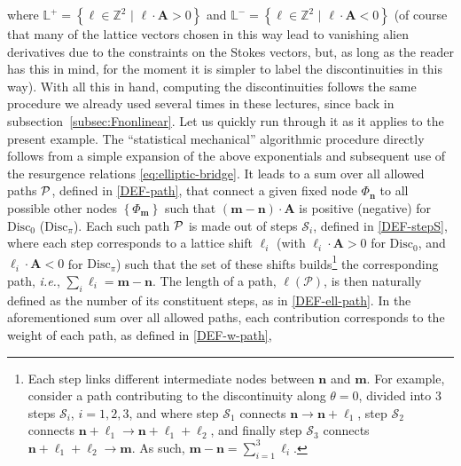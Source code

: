 \documentclass[11pt,a4paper]{article}
\newcommand{\CP}{{\cal P}}
\def\BL{{\mathbb L}}
\def\disc{{\mathrm{Disc}}}
\begin{document}
where $\BL^+ = \left\{ \boldsymbol{\ell} \in \mathbb{Z}^2 \,\,|\,\, \boldsymbol{\ell} \cdot \boldsymbol{A} >0 \right\}$ and $\BL^- = \left\{ \boldsymbol{\ell} \in \mathbb{Z}^2 \,\,|\,\, \boldsymbol{\ell} \cdot \boldsymbol{A} < 0 \right\}$ (of course that many of the lattice vectors chosen in this way lead to vanishing alien derivatives due to the constraints on the Stokes vectors, but, as long as the reader has this in mind, for the moment it is simpler to label the discontinuities in this way). With all this in hand, computing the discontinuities follows the same procedure we already used several times in these lectures, since back in subsection~\ref{subsec:Fnonlinear}. Let us quickly run through it as it applies to the present example. The ``statistical mechanical'' algorithmic procedure directly follows from a simple expansion of the above exponentials and subsequent use of the resurgence relations \eqref{eq:elliptic-bridge}. It leads to a sum over all allowed paths $\CP$, defined in \eqref{DEF-path}, that connect a given fixed node $\Phi_{\boldsymbol{n}}$ to all possible other nodes $\left\{ \Phi_{\boldsymbol{m}} \right\}$ such that $\left( \boldsymbol{m} - \boldsymbol{n} \right) \cdot \boldsymbol{A}$ is positive (negative) for $\disc_0$ ($\disc_\pi$). Each such path $\CP$ is made out of steps $\mathcal{S}_i$, defined in \eqref{DEF-stepS}, where each step corresponds to a lattice shift $\boldsymbol{\ell}_i$ (with $\boldsymbol{\ell}_i\cdot\boldsymbol{A}>0$ for $\disc_0$, and $\boldsymbol{\ell}_i\cdot\boldsymbol{A}<0$ for $\disc_\pi$) such that the set of these shifts builds\footnote{Each step links different intermediate nodes between $\boldsymbol{n}$ and $\boldsymbol{m}$. For example, consider a path contributing to the discontinuity along $\theta=0$, divided into 3 steps $\mathcal{S}_i$, $i=1,2,3$, and where step $\mathcal{S}_1$ connects $\boldsymbol{n} \rightarrow \boldsymbol{n} + \boldsymbol{\ell}_1$, step $\mathcal{S}_2$ connects $\boldsymbol{n} + \boldsymbol{\ell}_1 \rightarrow \boldsymbol{n} + \boldsymbol{\ell}_1 + \boldsymbol{\ell}_2$, and finally step $\mathcal{S}_3$ connects $\boldsymbol{n} + \boldsymbol{\ell}_1 + \boldsymbol{\ell}_2 \rightarrow \boldsymbol{m}$. As such, $\boldsymbol{m}-\boldsymbol{n} = \sum_{i=1}^3 \boldsymbol{\ell}_i$.} the corresponding path, \textit{i.e.}, $\sum_i \boldsymbol{\ell}_i = \boldsymbol{m}-\boldsymbol{n}$. The length of a path, $\ell (\mathcal{P})$, is then naturally defined as the number of its constituent steps, as in \eqref{DEF-ell-path}. In the aforementioned sum over all allowed paths, each contribution corresponds to the weight of each path, as defined in \eqref{DEF-w-path},
\end{document}
